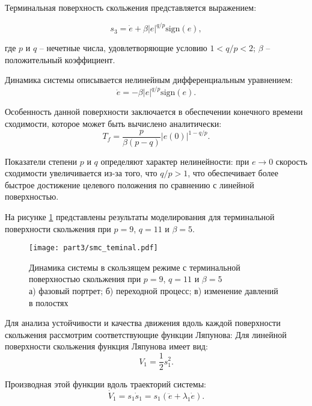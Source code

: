 Терминальная поверхность скольжения представляется выражением:

\begin{equation}
	s_3 = \dot{e} + \beta |e|^{q/p} \text{sign}(e),
\end{equation}

где $p$ и $q$ -- нечетные числа, удовлетворяющие условию $1 < q/p < 2$;
$\beta$ -- положительный коэффициент.

Динамика системы описывается нелинейным дифференциальным уравнением:
\begin{equation}
	\dot{e} = -\beta |e|^{q/p} \text{sign}(e).
\end{equation}

Особенность данной поверхности заключается в обеспечении конечного
времени сходимости, которое может быть вычислено аналитически:
\begin{equation}
	T_f = \frac{p}{\beta(p-q)}|e(0)|^{1-q/p}.
\end{equation}

Показатели степени $p$ и $q$ определяют характер
нелинейности: при $e \to 0$ скорость сходимости
увеличивается из-за того, что $q/p > 1$, что обеспечивает более быстрое достижение
целевого положения по сравнению с линейной поверхностью.

На рисунке \ref{fig:smc_terminal} представлены результаты моделирования для терминальной поверхности скольжения
при $p = 9$, $q = 11$ и $\beta = 5$.

\begin{figure}[ht]
	\centering
	\texttt{[image: part3/smc\_teminal.pdf]}
	\caption{Динамика системы в скользящем режиме с терминальной поверхностью скольжения при $p=9$, $q=11$ и $\beta=5$ \\
		а) фазовый портрет; б) переходной процесс; в) изменение давлений в полостях}
	\label{fig:smc_terminal}
\end{figure}


Для анализа устойчивости и качества движения вдоль каждой поверхности
скольжения рассмотрим соответствующие функции Ляпунова:
Для линейной поверхности скольжения функция Ляпунова имеет вид:
\begin{equation}
	V_1 = \frac{1}{2}s_1^2.
\end{equation}

Производная этой функции вдоль траекторий системы:
\begin{equation}
	\dot{V}_1 = s_1\dot{s}_1 = s_1(\ddot{e} + \lambda_1\dot{e}).
\end{equation}


